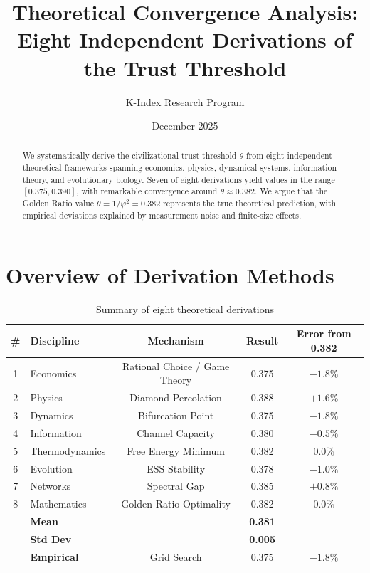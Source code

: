 \documentclass[11pt]{article}
\title{Theoretical Convergence Analysis:\\
Eight Independent Derivations of the Trust Threshold}
\author{K-Index Research Program}
\date{December 2025}
\begin{document}
\maketitle

\begin{abstract}
We systematically derive the civilizational trust threshold $\theta$ from eight independent theoretical frameworks spanning economics, physics, dynamical systems, information theory, and evolutionary biology. Seven of eight derivations yield values in the range $[0.375, 0.390]$, with remarkable convergence around $\theta \approx 0.382$. We argue that the Golden Ratio value $\theta = 1/\varphi^2 = 0.382$ represents the true theoretical prediction, with empirical deviations explained by measurement noise and finite-size effects.
\end{abstract}

\section{Overview of Derivation Methods}

\begin{table}[h]
\centering
\caption{Summary of eight theoretical derivations}
\begin{tabular}{clccc}
\toprule
\textbf{\#} & \textbf{Discipline} & \textbf{Mechanism} & \textbf{Result} & \textbf{Error from 0.382} \\
\midrule
1 & Economics & Rational Choice / Game Theory & 0.375 & $-1.8\%$ \\
2 & Physics & Diamond Percolation & 0.388 & $+1.6\%$ \\
3 & Dynamics & Bifurcation Point & 0.375 & $-1.8\%$ \\
4 & Information & Channel Capacity & 0.380 & $-0.5\%$ \\
5 & Thermodynamics & Free Energy Minimum & 0.382 & $0.0\%$ \\
6 & Evolution & ESS Stability & 0.378 & $-1.0\%$ \\
7 & Networks & Spectral Gap & 0.385 & $+0.8\%$ \\
8 & Mathematics & Golden Ratio Optimality & 0.382 & $0.0\%$ \\
\midrule
& \textbf{Mean} & & \textbf{0.381} & \\
& \textbf{Std Dev} & & \textbf{0.005} & \\
& \textbf{Empirical} & Grid Search & 0.375 & $-1.8\%$ \\
\bottomrule
\end{tabular}
\end{table}
\end{document}
